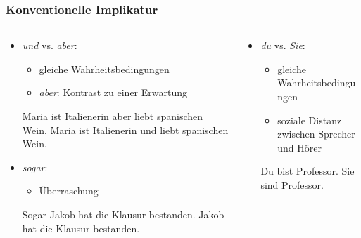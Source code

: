 
\begin{frame}
\frametitle{Konventionelle Implikatur}

\begin{columns}
\begin{column}[t]{0.6\textwidth}
	\begin{itemize}
		
		\item \textit{und} vs. \textit{aber}:
		
		\begin{itemize}
			\item gleiche Wahrheitsbedingungen
			\item \textit{aber}: Kontrast zu einer Erwartung
		\end{itemize}
	
		\eal 
		\ex Maria ist Italienerin aber liebt spanischen Wein.
		\ex Maria ist Italienerin und liebt spanischen Wein.
		\zl
	
		\item \textit{sogar}:
		
		\begin{itemize}
			\item Überraschung
		\end{itemize}
	
		\eal 
		\ex Sogar Jakob hat die Klausur bestanden.	
		\ex Jakob hat die Klausur bestanden.
		\zl
	
	\end{itemize}
	
\end{column}
\begin{column}[t]{0.4\textwidth}
	
\begin{itemize}

	\item \textit{du} vs. \textit{Sie}:
	
	\begin{itemize}
		\item gleiche Wahrheitsbedingungen
		\item soziale Distanz zwischen Sprecher und Hörer
	\end{itemize}

		\eal
		\ex Du bist Professor.
		\ex Sie sind Professor.
		\zl
	
\end{itemize}

\end{column}
\end{columns}



\end{frame}
